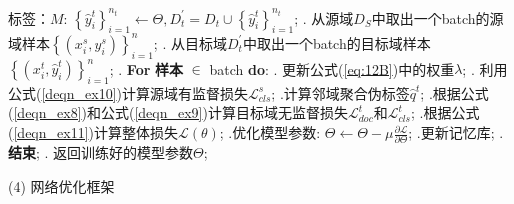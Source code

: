 \begin{algorithm}[!h]
\begin{algorithmic}
\STATE \hspace{1.16cm} 标签：$M$: $\left\{\hat{y}_{i}^{t}\right\}_{i=1}^{n_{t}} \leftarrow \Theta, D_{t}^{\prime}=D_{t} \cup\left\{\hat{y}_{i}^{t}\right\}_{i=1}^{n_{t}}$;
\vspace{0.22cm}
. \hspace{0.8cm}从源域$D_{S}$中取出一个batch的源域样本$\left\{\left(x_{i}^{s},y_{i}^{s}\right)\right\}_{i=1}^{n}$;
\vspace{0.22cm}
. \hspace{0.8cm}从目标域$D_{t}^{\prime}$中取出一个batch的目标域样本$\left\{\left(x_{i}^{t},\hat{y}_{i}^{t}\right)\right\}_{i=1}^{n}$;
\vspace{0.22cm}
. \hspace{0.8cm}\textbf{For} \textbf{样本} $\in$ batch \textbf{do}:
\vspace{0.22cm}
. \hspace{1.2cm}更新公式(\ref{eq:12B})中的权重$\lambda$;
\vspace{0.22cm}
. \hspace{1.2cm}利用公式(\ref{deqn_ex10})计算源域有监督损失$\mathcal{L}_{cls}^{s}$;
\vspace{0.22cm}
.\hspace{1.15cm}计算邻域聚合伪标签$\hat{q}^{t}$;
\vspace{0.22cm}
.\hspace{1.15cm}根据公式(\ref{deqn_ex8})和公式(\ref{deqn_ex9})计算目标域无监督损失$\mathcal{L}_{d o c}^{t}$和$\mathcal{L}_{c l s}^{t}$;
\vspace{0.22cm}
.\hspace{1.15cm}根据公式(\ref{deqn_ex11})计算整体损失$\mathcal{L}(\theta)$;
\vspace{0.22cm}
.\hspace{1.15cm}优化模型参数: $\Theta \leftarrow \Theta-\mu \frac{\partial \mathcal{L}}{\partial \Theta}$;
\vspace{0.22cm}
.\hspace{1.15cm}更新记忆库;
\vspace{0.22cm}
. {\textbf{结束}};
\vspace{0.22cm}
. 返回训练好的模型参数$\Theta$;
\end{algorithmic}
\end{algorithm}

(4) 网络优化框架

